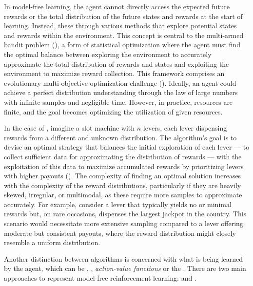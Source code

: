 \bigskip

\noindent In model-free learning, the agent cannot directly access the expected future rewards or the total distribution of the future states and rewards at the start of learning. Instead, these  through various methods that explore potential states and rewards within the environment. This concept is central to the multi-armed bandit problem (\cite{Sutton1998}), a form of statistical optimization where the agent must find the optimal balance between exploring the environment to accurately approximate the total distribution of rewards and states and exploiting the environment to maximize reward collection. This framework comprises an evolutionary multi-objective optimization challenge (\cite{Zitzler2012}). Ideally, an agent could achieve a perfect distribution understanding through the law of large numbers with infinite samples and negligible time. However, in practice, resources are finite, and the goal becomes optimizing the utilization of given resources.

\bigskip

\noindent In the case of , imagine a slot machine with $n$ levers, each lever dispensing rewards from a different and unknown distribution. The algorithm's goal is to devise an optimal strategy that balances the initial exploration of each lever — to collect sufficient data for approximating the distribution of rewards — with the exploitation of this data to maximize accumulated rewards by prioritizing levers with higher payouts (\cite{Sutton1998}). The complexity of finding an optimal solution increases with the complexity of the reward distributions, particularly if they are heavily skewed, irregular, or multimodal, as these require more samples to approximate accurately. For example, consider a lever that typically yields no or minimal rewards but, on rare occasions, dispenses the largest jackpot in the country. This scenario would necessitate more extensive sampling compared to a lever offering moderate but consistent payouts, where the reward distribution might closely resemble a uniform distribution.

\bigskip

\noindent Another distinction between algorithms is concerned with what is being learned by the agent, which can be , , \textit{action-value functions} or the . There are two main approaches to represent model-free reinforcement learning:  and .


